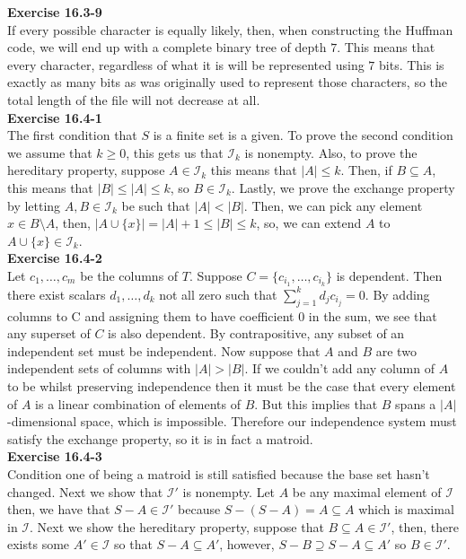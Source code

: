 \documentclass{article}
\begin{document}
\noindent\textbf{Exercise 16.3-9}\\

If every possible character is equally likely, then, when constructing the Huffman code, we will end up with a complete binary tree of depth $7$. This means that every character, regardless of what it is will be represented using $7$ bits. This is exactly as many bits as was originally used to represent those characters, so the total length of the file will not decrease at all.\\

\noindent\textbf{Exercise 16.4-1}\\

The first condition that $S$ is a finite set is a given. To prove the second condition we assume that $k\ge 0$, this gets us that $\mathcal{I}_k$ is nonempty. Also, to prove the hereditary property, suppose $A\in \mathcal{I}_k$ this means that $|A| \le k$. Then, if $B\subseteq A$, this means that $|B| \le |A| \le k$, so $B\in \mathcal{I}_k$. Lastly, we prove the exchange property by letting $A,B\in\mathcal{I}_k$ be such that $|A|<|B|$. Then, we can pick any element $x \in B\setminus A$, then, $|A\cup\{x\}|  = |A|+1 \le |B| \le k$, so, we can extend $A$ to $A\cup \{x\}\in \mathcal{I}_k$.\\

\noindent\textbf{Exercise 16.4-2}\\

Let $c_1, \ldots, c_m$ be the columns of $T$.  Suppose $C = \{c_{i_1}, \ldots, c_{i_k}\}$ is dependent.  Then there exist scalars $d_1, \ldots , d_k$ not all zero such that $\sum_{j=1}^k d_j c_{i_j} = 0$.  By adding columns to C and assigning them to have coefficient 0 in the sum, we see that any superset of $C$ is also dependent.  By contrapositive, any subset of an independent set must be independent.  Now suppose that $A$ and $B$ are two independent sets of columns with $|A| > |B|$.  If we couldn't add any column of $A$ to be whilst preserving independence then it must be the case that every element of $A$ is a linear combination of elements of $B$.  But this implies that $B$ spans a $|A|$-dimensional space, which is impossible.  Therefore our independence system must satisfy the exchange property, so it is in fact a matroid. \\

\noindent\textbf{Exercise 16.4-3}\\

Condition one of being a matroid is still satisfied because the base set hasn't changed. Next we show that $\mathcal{I}'$ is nonempty. Let $A$ be any maximal element of $\mathcal{I}$ then, we have that $S - A \in \mathcal{I}'$ because $S - (S-A) = A\subseteq A$ which is maximal in $\mathcal{I}$. Next we show the hereditary property, suppose that $B \subseteq A \in \mathcal{I}'$, then, there exists some $A'\in\mathcal{I}$ so that $S - A \subseteq A'$, however, $S-B \supseteq S-A \subseteq A'$ so $B\in \mathcal{I}'$.
\end{document}
